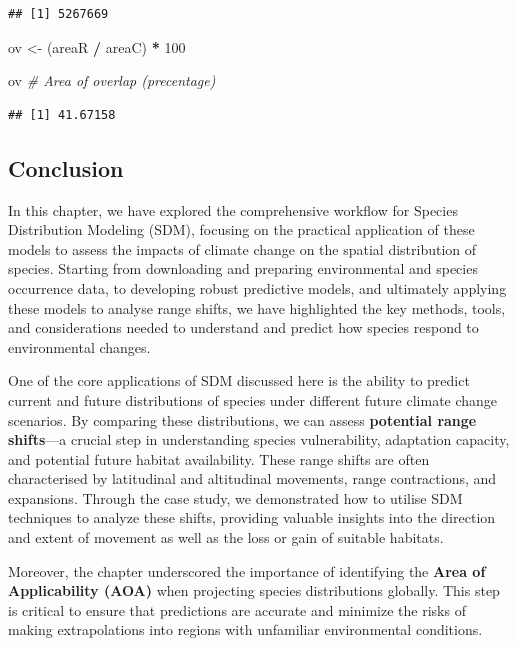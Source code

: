 \documentclass[
]{article}
\newenvironment{Shaded}{\begin{snugshade}}{\end{snugshade}}
\newcommand{\CommentTok}[1]{\textcolor[rgb]{0.56,0.35,0.01}{\textit{#1}}}
\newcommand{\DecValTok}[1]{\textcolor[rgb]{0.00,0.00,0.81}{#1}}
\newcommand{\NormalTok}[1]{#1}
\newcommand{\OtherTok}[1]{\textcolor[rgb]{0.56,0.35,0.01}{#1}}
\newcommand{\SpecialCharTok}[1]{\textcolor[rgb]{0.81,0.36,0.00}{\textbf{#1}}}
\begin{document}
\begin{verbatim}
## [1] 5267669
\end{verbatim}

\begin{Shaded}
\begin{Highlighting}[]
\NormalTok{ov }\OtherTok{\textless{}{-}}\NormalTok{ (areaR }\SpecialCharTok{/}\NormalTok{ areaC) }\SpecialCharTok{*} \DecValTok{100}

\NormalTok{ov }\CommentTok{\# Area of overlap (precentage)}
\end{Highlighting}
\end{Shaded}

\begin{verbatim}
## [1] 41.67158
\end{verbatim}

\subsection{Conclusion}\label{conclusion}

In this chapter, we have explored the comprehensive workflow for Species
Distribution Modeling (SDM), focusing on the practical application of
these models to assess the impacts of climate change on the spatial
distribution of species. Starting from downloading and preparing
environmental and species occurrence data, to developing robust
predictive models, and ultimately applying these models to analyse range
shifts, we have highlighted the key methods, tools, and considerations
needed to understand and predict how species respond to environmental
changes.

One of the core applications of SDM discussed here is the ability to
predict current and future distributions of species under different
future climate change scenarios. By comparing these distributions, we
can assess \textbf{potential range shifts}---a crucial step in
understanding species vulnerability, adaptation capacity, and potential
future habitat availability. These range shifts are often characterised
by latitudinal and altitudinal movements, range contractions, and
expansions. Through the case study, we demonstrated how to utilise SDM
techniques to analyze these shifts, providing valuable insights into the
direction and extent of movement as well as the loss or gain of suitable
habitats.

Moreover, the chapter underscored the importance of identifying the
\textbf{Area of Applicability (AOA)} when projecting species
distributions globally. This step is critical to ensure that predictions
are accurate and minimize the risks of making extrapolations into
regions with unfamiliar environmental conditions.
\end{document}
